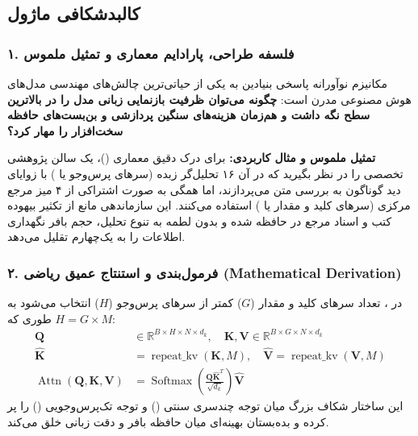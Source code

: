 \subsection{کالبدشکافی ماژول }

\subsubsection*{۱. فلسفه طراحی، پارادایم معماری و تمثیل ملموس}
مکانیزم نوآورانه  پاسخی بنیادین به یکی از حیاتی‌ترین چالش‌های مهندسی مدل‌های هوش مصنوعی مدرن است: \textbf{چگونه می‌توان ظرفیت بازنمایی زبانی مدل را در بالاترین سطح نگه داشت و هم‌زمان هزینه‌های سنگین پردازشی و بن‌بست‌های حافظه سخت‌افزار را مهار کرد؟}

\textbf{تمثیل ملموس و مثال کاربردی:}
برای درک دقیق معماری  ()، یک سالن پژوهشی تخصصی را در نظر بگیرید که در آن ۱۶ تحلیل‌گر زبده (سرهای پرس‌وجو یا ) با زوایای دید گوناگون به بررسی متن می‌پردازند، اما همگی به صورت اشتراکی از ۴ میز مرجع مرکزی (سرهای کلید و مقدار یا ) استفاده می‌کنند. این سازماندهی مانع از تکثیر بیهوده کتب و اسناد مرجع در حافظه شده و بدون لطمه به تنوع تحلیل، حجم بافر نگهداری اطلاعات را به یک‌چهارم تقلیل می‌دهد.

\subsubsection*{۲. فرمول‌بندی و استنتاج عمیق ریاضی (Mathematical Derivation)}
در ، تعداد سرهای کلید و مقدار ($G$) کمتر از سرهای پرس‌وجو ($H$) انتخاب می‌شود به طوری که $H = G \times M$:
\begin{align}
\mathbf{Q} &\in \mathbb{R}^{B \times H \times N \times d_k}, \quad \mathbf{K}, \mathbf{V} \in \mathbb{R}^{B \times G \times N \times d_k} \\
\hat{\mathbf{K}} &= \operatorname{repeat\_kv}(\mathbf{K}, M), \quad \hat{\mathbf{V}} = \operatorname{repeat\_kv}(\mathbf{V}, M) \\
\operatorname{Attn}(\mathbf{Q}, \mathbf{K}, \mathbf{V}) &= \operatorname{Softmax}\left(\frac{\mathbf{Q} \hat{\mathbf{K}}^T}{\sqrt{d_k}}\right) \hat{\mathbf{V}}
\end{align}
این ساختار شکاف بزرگ میان توجه چندسری سنتی () و توجه تک‌پرس‌وجویی () را پر کرده و بده‌بستان بهینه‌ای میان حافظه بافر و دقت زبانی خلق می‌کند.

